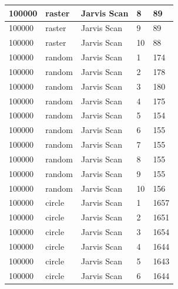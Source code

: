 \documentclass[12pt]{article}
\begin{document}
\begin{longtable}{|l|l|l|l|l|}
100000       & raster            & Jarvis Scan & 8          & 89                            \\ \hline
100000       & raster            & Jarvis Scan & 9          & 89                            \\ \hline
100000       & raster            & Jarvis Scan & 10         & 88                            \\ \hline
100000       & random            & Jarvis Scan & 1          & 174                           \\ \hline
100000       & random            & Jarvis Scan & 2          & 178                           \\ \hline
100000       & random            & Jarvis Scan & 3          & 180                           \\ \hline
100000       & random            & Jarvis Scan & 4          & 175                           \\ \hline
100000       & random            & Jarvis Scan & 5          & 154                           \\ \hline
100000       & random            & Jarvis Scan & 6          & 155                           \\ \hline
100000       & random            & Jarvis Scan & 7          & 155                           \\ \hline
100000       & random            & Jarvis Scan & 8          & 155                           \\ \hline
100000       & random            & Jarvis Scan & 9          & 155                           \\ \hline
100000       & random            & Jarvis Scan & 10         & 156                           \\ \hline
100000       & circle            & Jarvis Scan & 1          & 1657                          \\ \hline
100000       & circle            & Jarvis Scan & 2          & 1651                          \\ \hline
100000       & circle            & Jarvis Scan & 3          & 1654                          \\ \hline
100000       & circle            & Jarvis Scan & 4          & 1644                          \\ \hline
100000       & circle            & Jarvis Scan & 5          & 1643                          \\ \hline
100000       & circle            & Jarvis Scan & 6          & 1644                          \\ \hline

\end{longtable}
\end{document}
